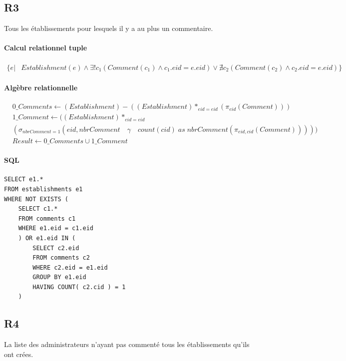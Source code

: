 \documentclass[11pt,a4paper]{report}
\begin{document}
\subsection*{R3}


Tous les établissements pour lesquels il y a au plus un commentaire.
\paragraph*{Calcul relationnel tuple}
\begin{align*}
\{ e | & Establishment(e) \wedge \exists! c_{1} ( Comment(c_{1}) \wedge c_{1}.eid = e.eid ) \vee \nexists c_{2} ( Comment(c_{2}) \wedge c_{2}.eid = e.eid )
\}
\end{align*}
\paragraph*{Algèbre relationnelle}
\begin{align*}
& 0\_Comments \leftarrow (Establishment) - ((Establishment) *_{eid=eid} (\pi_{eid} (Comment))) \\
& 1\_Comment \leftarrow ((Establishment) *_{eid=eid} \\ 
&(\sigma_{nbrComment = 1} (eid, nbrComment \quad \gamma \quad count(cid) \; as\;  nbrComment ( \pi_{eid, cid}(Comment) )))) \\
& Result \leftarrow 0\_Comments \cup 1\_Comment
\end{align*}
\paragraph*{SQL}
\begin{verbatim}
SELECT e1.*
FROM establishments e1
WHERE NOT EXISTS (
    SELECT c1.*
    FROM comments c1
    WHERE e1.eid = c1.eid
    ) OR e1.eid IN (
        SELECT c2.eid
        FROM comments c2
        WHERE c2.eid = e1.eid
        GROUP BY e1.eid
        HAVING COUNT( c2.cid ) = 1
    )
\end{verbatim}
\subsection*{R4}


La liste des administrateurs n’ayant pas commenté tous les établissements qu’ils ont crées.
\end{document}
